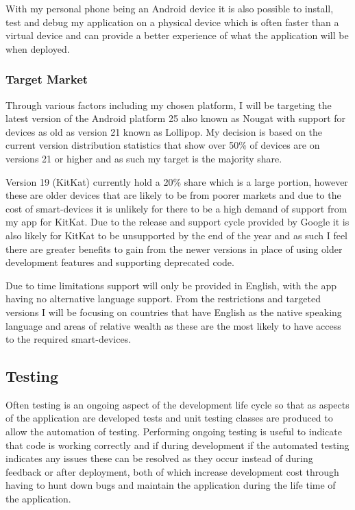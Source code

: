 With my personal phone being an Android device it is also possible to
install, test and debug my application on a physical device which is
often faster than a virtual device and can provide a better experience
of what the application will be when deployed.

\subsubsection{Target Market}\label{target-market}

Through various factors including my chosen platform, I will be
targeting the latest version of the Android platform 25 also known as
Nougat with support for devices as old as version 21 known as Lollipop.
My decision is based on the current version distribution statistics that
show over 50\% of devices are on versions 21 or higher and as such my
target is the majority share.

Version 19 (KitKat) currently hold a 20\% share which is a large
portion, however these are older devices that are likely to be from
poorer markets and due to the cost of smart-devices it is unlikely for
there to be a high demand of support from my app for KitKat. Due to the
release and support cycle provided by Google it is also likely for
KitKat to be unsupported by the end of the year and as such I feel there
are greater benefits to gain from the newer versions in place of using
older development features and supporting deprecated code.

Due to time limitations support will only be provided in English, with
the app having no alternative language support. From the restrictions
and targeted versions I will be focusing on countries that have English
as the native speaking language and areas of relative wealth as these
are the most likely to have access to the required smart-devices.

\subsection{Testing}\label{testing}

Often testing is an ongoing aspect of the development life cycle so that
as aspects of the application are developed tests and unit testing
classes are produced to allow the automation of testing. Performing
ongoing testing is useful to indicate that code is working correctly and
if during development if the automated testing indicates any issues
these can be resolved as they occur instead of during feedback or after
deployment, both of which increase development cost through having to
hunt down bugs and maintain the application during the life time of the
application.

